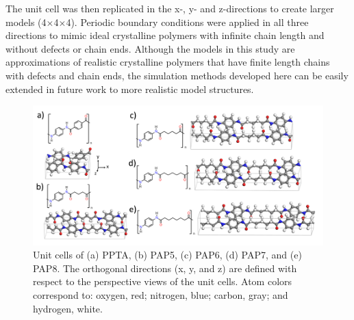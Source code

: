 \documentclass[journal=langd5,manuscript=article]{achemso}
\begin{document}

The unit cell was then replicated in the x-, y- and z-directions to create larger models (4$\times$4$\times$4).
Periodic boundary conditions were applied in all three directions to mimic ideal crystalline polymers with infinite chain length and without defects or chain ends.
Although the models in this study are approximations of realistic crystalline polymers that have finite length chains with defects and chain ends, the simulation methods developed here can be easily extended in future work to more realistic model structures. 

\begin{figure}[ht]
\centering
\includegraphics[scale=0.5]{Models.png}
\caption{Unit cells of (a) PPTA, (b) PAP5, (c) PAP6, (d) PAP7, and (e) PAP8. The orthogonal directions (x, y, and z) are defined with respect to the perspective views of the unit cells. Atom colors correspond to: oxygen, red; nitrogen, blue; carbon, gray; and hydrogen, white.}
\label{fig:model}
\end{figure} 
\end{document}
